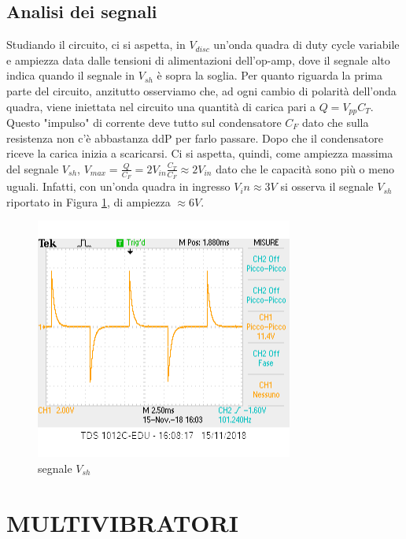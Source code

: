 \documentclass[10pt,a4paper]{article}
\begin{document}
	\subsection{Analisi dei segnali}
		Studiando il circuito, ci si aspetta, in $V_{disc}$ un'onda quadra di duty cycle variabile e ampiezza data dalle tensioni di alimentazioni dell'op-amp, dove il segnale alto indica quando il segnale in $V_{sh}$ è sopra la soglia.
		Per quanto riguarda la prima parte del circuito, anzitutto osserviamo che, ad ogni cambio di polarità dell'onda quadra, viene iniettata nel circuito una quantità di carica pari a $Q=V_{pp} C_T$. Questo "impulso" di corrente deve tutto sul condensatore $C_F$ dato che sulla resistenza non c'è abbastanza ddP per farlo passare.
		Dopo che il condensatore riceve la carica inizia a scaricarsi. Ci si aspetta, quindi, come ampiezza massima del segnale $V_{sh}$, $V_{max}=\frac{Q}{C_F}=2 V_{in} \frac{C_T}{C_F}\approx 2 V_{in} $ dato che le capacità sono più o meno uguali. Infatti, con un'onda quadra in ingresso $V_in\approx3V$ si osserva il segnale $V_{sh}$ riportato in Figura \ref{fig:sample}, di ampiezza $\approx 6V$.
		\begin{figure}
			\centering
			\includegraphics{sample.png}
			\caption{segnale $V_{sh}$}
			\label{fig:sample}
		\end{figure}
	
\clearpage	
\section{ MULTIVIBRATORI }
\end{document}
